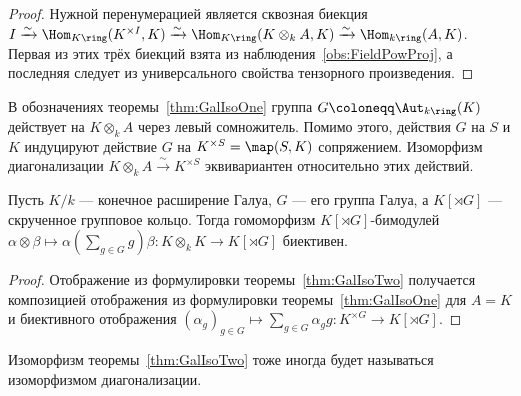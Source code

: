 \documentclass[
	extrafontsizes,
	11pt,
	hyphens,
]{memoir}
\begin{document}
\begin{proof}
Нужной перенумерацией является сквозная биекция
\(
I \xrightarrow{\sim} \Hom_{K\ring}(K^{\times I}, K) \xrightarrow{\sim} \Hom_{K\ring}(K \otimes_k A, K) \xrightarrow{\sim} \Hom_{k\ring}(A,K)
\).
Первая из этих трёх биекций взята из наблюдения~\ref{obs:FieldPowProj}, а последняя следует из универсального свойства тензорного произведения.
\end{proof}


\begin{observation}
В обозначениях теоремы~\ref{thm:GalIsoOne} группа \(G \coloneqq \Aut_{k\ring}(K)\) действует на \(K \otimes_k A\) через левый сомножитель. Помимо этого, действия \(G\) на \(S\) и \(K\) индуцируют действие \(G\) на \(K^{\times S} = \map(S, K)\) сопряжением.%
\label{obs:DiagEquivar}
Изоморфизм диагонализации \(K \otimes_k A \xrightarrow{\sim} K^{\times S}\) эквивариантен относительно этих действий.
\end{observation}

\begin{theorem}
Пусть \(K/k\) --- конечное расширение Галуа, \(G\) --- его группа Галуа, а \(K[\rtimes G]\) --- скрученное групповое кольцо.%
Тогда гомоморфизм \(K[\rtimes G]\)-би\-мо\-ду\-лей
\(\alpha \otimes \beta \mapsto \alpha (\sum_{g \in G} g) \beta : K \otimes_k K \to K[\rtimes G]\)
биективен.
\end{theorem}

\begin{proof}
Отображение из формулировки теоремы~\ref{thm:GalIsoTwo} получается композицией отображения из формулировки теоремы~\ref{thm:GalIsoOne} для \(A = K\) и биективного отображения
\(
(\alpha_g)_{g \in G}
\mapsto
\sum_{g \in G} \alpha_g g :
K^{\times G} \to K[\rtimes G]
\).
\end{proof}

\begin{remark}
Изоморфизм теоремы~\ref{thm:GalIsoTwo} тоже иногда будет называться изоморфизмом диагонализации.
\end{remark}
\end{document}
